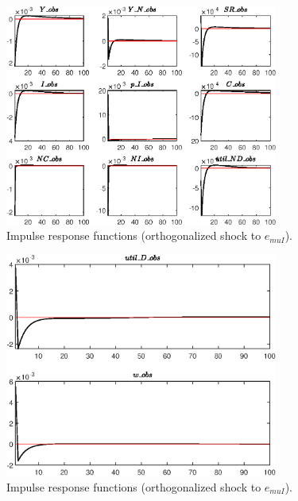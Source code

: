 \begin{figure}[H]
\centering 
\includegraphics[width=0.80\textwidth]{RBC_sectoral/graphs/RBC_sectoral_IRF_e_muI1}
\caption{Impulse response functions (orthogonalized shock to ${e_{muI}}$).}\label{Fig:IRF:e_muI:1}
\end{figure}
 
\begin{figure}[H]
\centering 
\includegraphics[width=0.80\textwidth]{RBC_sectoral/graphs/RBC_sectoral_IRF_e_muI2}
\caption{Impulse response functions (orthogonalized shock to ${e_{muI}}$).}\label{Fig:IRF:e_muI:2}
\end{figure}
 
